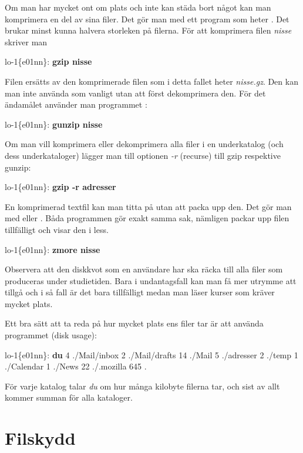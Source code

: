 \documentclass[a4paper,twocolumn]{book}
\begin{document}
Om man har mycket ont om plats och inte kan städa bort något kan man
komprimera en del av
sina filer. Det gör man med ett program som heter . Det
brukar minst kunna halvera storleken på filerna. För att komprimera
filen \emph{nisse} skriver man
\begin{example}
lo-1\{e01nn\}: \textbf{gzip nisse}
\end{example}
Filen ersätts av den komprimerade filen som i detta fallet heter
\emph{nisse.gz}. Den kan man inte använda som vanligt utan att först
dekomprimera den. För det ändamålet använder man programmet
:
\begin{example}
lo-1\{e01nn\}: \textbf{gunzip nisse}
\end{example}
Om man vill komprimera eller dekomprimera alla filer i en underkatalog
(och dess underkataloger) lägger man till optionen \emph{-r} (recurse)
till gzip respektive gunzip:
\begin{example}
lo-1\{e01nn\}: \textbf{gzip -r adresser}
\end{example}
En komprimerad textfil kan man titta på utan att packa upp den. Det
gör man med  eller . Båda programmen gör
exakt samma sak, nämligen packar upp filen tillfälligt och visar den i
less.
\begin{example}
lo-1\{e01nn\}: \textbf{zmore nisse}
\end{example}

Observera att den diskkvot som en användare har ska räcka till alla
filer som produceras under studietiden. Bara i undantagsfall kan man
få mer utrymme att tillgå och i så fall är det bara tillfälligt medan
man läser kurser som kräver mycket plats.

Ett bra sätt att ta reda på hur mycket plats ens filer tar är att
använda programmet  (disk usage):
\begin{example}
lo-1\{e01nn\}: \textbf{du}
4       ./Mail/inbox
2       ./Mail/drafts
14      ./Mail
5       ./adresser
2       ./temp
1       ./Calendar
1       ./News
22      ./.mozilla
645     .
\end{example}
För varje katalog talar \emph{du} om hur många kilobyte filerna tar,
och sist av allt kommer summan för alla kataloger.

\section{Filskydd}
\end{document}
